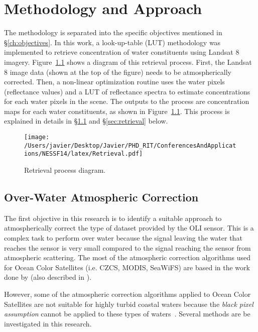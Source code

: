 \chapter{Methodology and Approach}
\label{ch:method}

The methodology is separated into the specific objectives mentioned in \S\ref{ch:objectives}. In this work, a look-up-table (LUT) methodology was implemented to retrieve concentration of water constituents using Landsat 8 imagery. Figure~\ref{fig:retrieval} shows a diagram of this retrieval process. First, the Landsat 8 image data (shown at the top of the figure) needs to be atmospherically corrected. Then, a non-linear optimization routine uses the water pixels (reflectance values) and a LUT of reflectance spectra to estimate concentrations for each water pixels in the scene. The outputs to the process are concentration maps for each water constituents, as shown in Figure~\ref{fig:retrieval}. This process is explained in details in \S\ref{sec:atmcorr} and \S\ref{sec:retrieval} below.
\begin{figure}[htb]
  \centering
  \texttt{[image: /Users/javier/Desktop/Javier/PHD\_RIT/ConferencesAndApplications/NESSF14/latex/Retrieval.pdf]}
  \caption{Retrieval process diagram. \label{fig:retrieval} } 
\end{figure}

\section{Over-Water Atmospheric Correction} 
\label{sec:atmcorr}
The first objective in this research is to identify a suitable approach to atmospherically correct the type of dataset provided by the OLI sensor. This is a complex task to perform over water because the signal leaving the water that reaches the sensor is very small compared to the signal reaching the sensor from atmospheric scattering. The most of the atmospheric correction algorithms used for Ocean Color Satellites (i.e. CZCS, MODIS, SeaWiFS) are based in the work done by \cite{Gordon:1994} (also described in \cite{Gordon:1997}).

However, some of the atmospheric correction algorithms applied to Ocean Color Satellites are not suitable for highly turbid coastal waters because the {\it black pixel assumption} cannot be applied to these types of waters~\cite{Patt2003}. Several methods are be investigated in this research.

